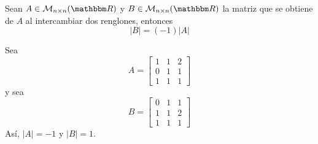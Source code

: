 \newpage

\begin{proposition}
    Sean $A \in \mathcal{M}_{n \times n}(\RR)$ y $B \in \mathcal{M}_{n \times n}(\RR)$ la matriz que se obtiene de $A$ al intercambiar dos renglones, entonces
    $$|B| = (-1)|A|$$
\end{proposition}

\begin{example}
    Sea
    $$A = \begin{bmatrix}
        1 & 1 & 2 \\
        0 & 1 & 1 \\
        1 & 1 & 1
    \end{bmatrix}$$
    y sea
    $$B = \begin{bmatrix}
        0 & 1 & 1 \\
        1 & 1 & 2 \\
        1 & 1 & 1
    \end{bmatrix}$$
    Así, $|A| = -1$ y $|B| = 1$.
\end{example}

